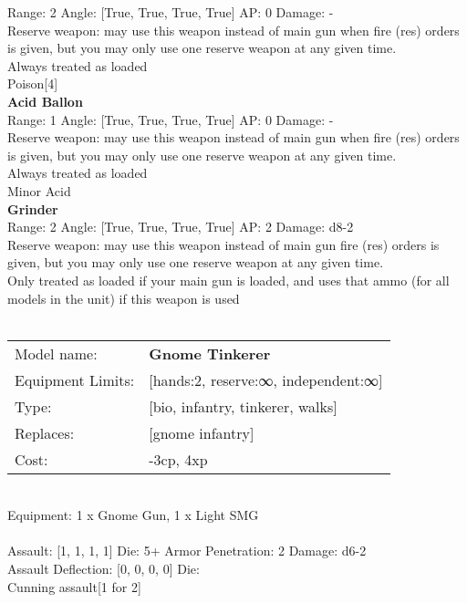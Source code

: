 Range: 2  Angle: [True, True, True, True] AP: 0 Damage: - \\
Reserve weapon: may use this weapon instead of main gun when fire (res) orders is given, but you may only use one reserve weapon at any given time.\\ 
Always treated as loaded\\ 
Poison[4]\\ 




{\bf Acid Ballon } \\



Range: 1  Angle: [True, True, True, True] AP: 0 Damage: - \\
Reserve weapon: may use this weapon instead of main gun when fire (res) orders is given, but you may only use one reserve weapon at any given time.\\ 
Always treated as loaded\\ 
Minor Acid\\ 




{\bf Grinder } \\



Range: 2  Angle: [True, True, True, True] AP: 2 Damage: d8-2 \\
Reserve weapon: may use this weapon instead of main gun fire (res) orders is given, but you may only use one reserve weapon at any given time.\\ 
Only treated as loaded if your main gun is loaded, and uses that ammo (for all models in the unit) if this weapon is used\\ 




 
\ \\

\noindent
\begin{tabular}{ll}
Model name: &{\bf Gnome Tinkerer } \\
Equipment Limits: &[hands:2, reserve:∞, independent:∞] \\
Type: &[bio, infantry, tinkerer, walks] \\
Replaces: &[gnome infantry] \\
Cost: & -3cp, 4xp\\
\end{tabular}
\ \\
Equipment: 1 x Gnome Gun, 1 x Light SMG \\
\ \\
Assault: [1, 1, 1, 1] Die: 5+ Armor Penetration: 2 Damage: d6-2 \\
Assault Deflection: [0, 0, 0, 0] Die: \\
\indent Cunning assault[1 for 2]\\ 
 
